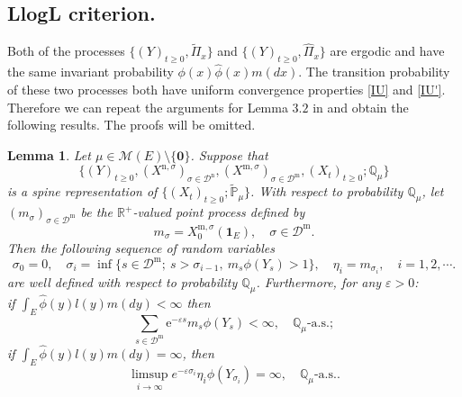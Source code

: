 \documentclass[12pt,a4paper]{amsart}
\theoremstyle{plain}
\newtheorem{lem}[thm]{Lemma}
\theoremstyle{definition}
\numberwithin{equation}{section}
\begin{document}
\subsection{LlogL criterion.}
	Both of the processes $\{(Y)_{t\geq 0}, \widetilde\Pi_x\}$ and $\{(Y)_{t\geq 0}, \widehat{\Pi}_x\}$ are ergodic and have the same invariant probability $\phi(x)\hat\phi(x)m(dx)$.
	The transition probability of these two processes both have uniform convergence properties \eqref{IU} and \eqref{IU'}.
	Therefore we can repeat the arguments for Lemma $3.2$ in \cite{LiuRenSong2009Llog} and obtain the following results.
	The proofs will be omitted.

\begin{lem}\label{import lemma}
	Let $\mu \in \mathcal M(E)\setminus \{\mathbf 0\}$.
	Suppose that \[\{(Y)_{t\geq 0}, (X^{\mathrm n, \sigma})_{\sigma\in \mathcal D^\mathrm n}, (X^{\mathrm m, \sigma})_{\sigma \in \mathcal D^\mathrm m}, (X_t)_{t\geq 0}; \mathbb Q_{\mu}\}\] is a spine representation of $\{(X_t)_{t\geq 0}; \widetilde {\mathbb P}_\mu\}$.
	With respect to probability $\mathbb Q_\mu$, let $(m_\sigma)_{\sigma\in \mathcal D^{\mathrm m}}$ be the $\mathbb R^+$-valued point process defined by
\[
  	m_\sigma = X^{\mathrm m, \sigma}_0(\mathbf 1_E),
  	\quad \sigma \in \mathcal D^{\mathrm m}.
\]
	Then the following sequence of random variables
\[
	\sigma_0=0,\quad \sigma_i=\inf\{s\in\mathcal D^{\mathrm m};\ s>\sigma_{i-1},\ m_s\phi(Y_s)>1\}, \quad\eta_i=m_{\sigma_i},\quad i=1,2,\cdots.
\]
	are well defined with respect to probability $\mathbb Q_\mu$.
	Furthermore, for any $\varepsilon>0$:
	\\if $\int_E\hat{\phi}(y)l(y)m(dy)<\infty$ then
\[
	\sum_{s\in\mathcal
	D^{\mathrm m}}\mbox{e}^{-\varepsilon s}m_s\phi(Y_s) < \infty, \quad
	\mathbb Q_{\mu}\text{-a.s.};
\]
	if $ \int_E\hat{\phi}(y)l(y)m(dy)=\infty$, then
\[
	\limsup_{i\rightarrow\infty}e^{-\varepsilon \sigma_i}\eta_i
	\phi(Y_{\sigma_i})=\infty,
	\quad \mathbb Q_{\mu}\text{-a.s.}.
\]
\end{lem}
\end{document}
